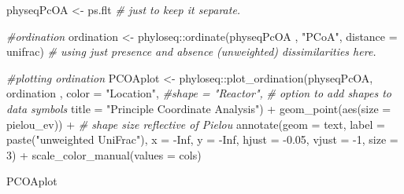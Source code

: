 \documentclass[
]{book}
\newenvironment{Shaded}{\begin{snugshade}}{\end{snugshade}}
\newcommand{\AttributeTok}[1]{\textcolor[rgb]{0.77,0.63,0.00}{#1}}
\newcommand{\CommentTok}[1]{\textcolor[rgb]{0.56,0.35,0.01}{\textit{#1}}}
\newcommand{\ConstantTok}[1]{\textcolor[rgb]{0.00,0.00,0.00}{#1}}
\newcommand{\DecValTok}[1]{\textcolor[rgb]{0.00,0.00,0.81}{#1}}
\newcommand{\FloatTok}[1]{\textcolor[rgb]{0.00,0.00,0.81}{#1}}
\newcommand{\FunctionTok}[1]{\textcolor[rgb]{0.00,0.00,0.00}{#1}}
\newcommand{\NormalTok}[1]{#1}
\newcommand{\OtherTok}[1]{\textcolor[rgb]{0.56,0.35,0.01}{#1}}
\newcommand{\SpecialCharTok}[1]{\textcolor[rgb]{0.00,0.00,0.00}{#1}}
\newcommand{\StringTok}[1]{\textcolor[rgb]{0.31,0.60,0.02}{#1}}
\begin{document}
\begin{Shaded}
\begin{Highlighting}[]
\NormalTok{physeqPcOA }\OtherTok{\textless{}{-}}\NormalTok{  ps.flt  }\CommentTok{\# just to keep it separate.}

\CommentTok{\#ordination}
\NormalTok{ordination }\OtherTok{\textless{}{-}}\NormalTok{ phyloseq}\SpecialCharTok{::}\FunctionTok{ordinate}\NormalTok{(physeqPcOA  , }
                                 \StringTok{"PCoA"}\NormalTok{, }
                                 \AttributeTok{distance =} \StringTok{\textquotesingle{}unifrac\textquotesingle{}}\NormalTok{) }\CommentTok{\# using just presence and absence (unweighted) dissimilarities here. }

\CommentTok{\#plotting ordination}
\NormalTok{PCOAplot }\OtherTok{\textless{}{-}}\NormalTok{ phyloseq}\SpecialCharTok{::}\FunctionTok{plot\_ordination}\NormalTok{(physeqPcOA, }
\NormalTok{                                      ordination , }
                                      \AttributeTok{color =} \StringTok{"Location"}\NormalTok{, }
                                      \CommentTok{\#shape = "Reactor",    }
                                      \CommentTok{\# option to add shapes to data symbols}
                                      \AttributeTok{title =} \StringTok{"Principle Coordinate Analysis"}\NormalTok{) }\SpecialCharTok{+}
     \FunctionTok{geom\_point}\NormalTok{(}\FunctionTok{aes}\NormalTok{(}\AttributeTok{size =}\NormalTok{ pielou\_ev)) }\SpecialCharTok{+}    \CommentTok{\# shape size reflective of Pielou  }
     \FunctionTok{annotate}\NormalTok{(}\AttributeTok{geom =} \StringTok{\textquotesingle{}text\textquotesingle{}}\NormalTok{, }\AttributeTok{label =} \FunctionTok{paste}\NormalTok{(}\StringTok{"unweighted UniFrac"}\NormalTok{), }
             \AttributeTok{x =} \SpecialCharTok{{-}}\ConstantTok{Inf}\NormalTok{, }\AttributeTok{y =} \SpecialCharTok{{-}}\ConstantTok{Inf}\NormalTok{, }\AttributeTok{hjust =} \SpecialCharTok{{-}}\FloatTok{0.05}\NormalTok{, }\AttributeTok{vjust =} \SpecialCharTok{{-}}\DecValTok{1}\NormalTok{, }\AttributeTok{size =} \DecValTok{3}\NormalTok{)  }\SpecialCharTok{+}
     \FunctionTok{scale\_color\_manual}\NormalTok{(}\AttributeTok{values =}\NormalTok{ cols)}

\NormalTok{PCOAplot}
\end{Highlighting}
\end{Shaded}
\end{document}
